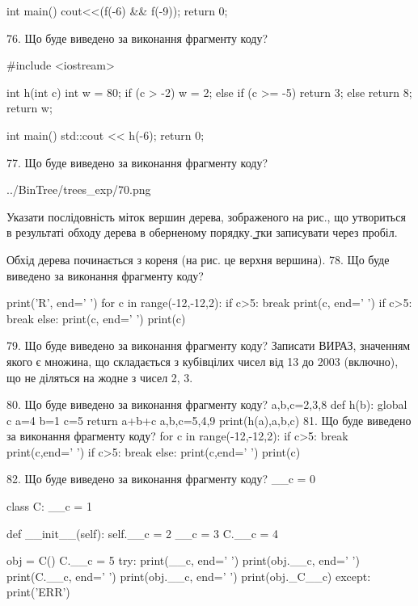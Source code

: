 \documentclass[11pt]{article}
\begin{document}
int main(){
    cout<<(f(-6) && f(-9));
    return 0;
}

76. Що буде виведено за виконання фрагменту коду?

#include <iostream>

int h(int c){
    int w = 80;
    if (c > -2) 
        w = 2;
    else if (c >= -5)
         return 3;
    else
         return 8;
    return w;
}

int main(){
    std::cout << h(-6);
    return 0;
}


77. Що буде виведено за виконання фрагменту коду?

\begin{center}
	{../BinTree/trees_exp/70.png}
\end{center}
Указати послідовність міток вершин дерева, зображеного на рис., що утвориться в результаті обходу дерева в оберненому порядку. ̳тки записувати через пробіл.\par Обхід дерева починається з кореня (на рис. це верхня вершина).
78. Що буде виведено за виконання фрагменту коду?

print('R', end=' ')
for c in range(-12,-12,2):
    if c>5:
        break
        print(c, end=' ')
    if c>5:
        break
    else:
        print(c, end=' ')
    print(c)

79. Що буде виведено за виконання фрагменту коду?
Записати ВИРАЗ, значенням якого є множина, що складається з кубівцілих чисел від 13 до 2003 (включно), що не діляться на жодне з чисел 2, 3.

80. Що буде виведено за виконання фрагменту коду?
a,b,c=2,3,8
   def h(b):
     global c     a=4
     b=1
     c=5
     return a+b+c
   a,b,c=5,4,9
   print(h(a),a,b,c)
81. Що буде виведено за виконання фрагменту коду?
for c in range(-12,-12,2):
    if c>5:
        break
        print(c,end=' ')
    if c>5:
        break
    else:
        print(c,end=' ')
    print(c)

82. Що буде виведено за виконання фрагменту коду?
__c = 0

class C:
    __c = 1
    
    def __init__(self):
        self.__c = 2
        __c = 3
        C.__c = 4

obj = C()
C.__c = 5
try:
    print(__c, end=' ')
    print(obj.__c, end=' ')
    print(C.__c, end=' ')
    print(obj.__c, end=' ')
    print(obj._C__c)
except:
    print('ERR')
\end{document}
